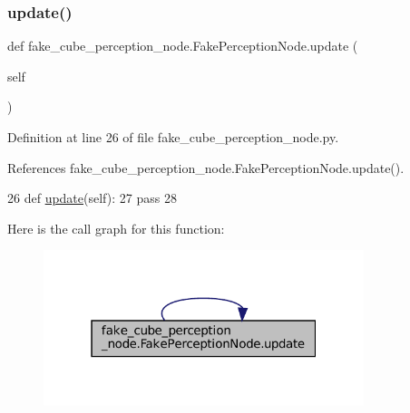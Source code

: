\subsubsection{\texorpdfstring{update()}{update()}\hspace{0.1cm}{\footnotesize\ttfamily [1/3]}}
{\footnotesize\ttfamily def fake\+\_\+cube\+\_\+perception\+\_\+node.\+Fake\+Perception\+Node.\+update (\begin{DoxyParamCaption}\item[{}]{self }\end{DoxyParamCaption})}



Definition at line 26 of file fake\+\_\+cube\+\_\+perception\+\_\+node.\+py.



References fake\+\_\+cube\+\_\+perception\+\_\+node.\+Fake\+Perception\+Node.\+update().


\begin{DoxyCode}
26     \textcolor{keyword}{def }\hyperlink{classfake__cube__perception__node_1_1FakePerceptionNode_ae73741e7f84f057cbf109698e70a2515}{update}(self):
27         \textcolor{keywordflow}{pass}
28 
\end{DoxyCode}
Here is the call graph for this function\+:
\nopagebreak
\begin{figure}[H]
\begin{center}
\leavevmode
\includegraphics[width=265pt]{classfake__cube__perception__node_1_1FakePerceptionNode_ae73741e7f84f057cbf109698e70a2515_cgraph}
\end{center}
\end{figure}
\mbox{\label{classfake__cube__perception__node_1_1FakePerceptionNode_ae73741e7f84f057cbf109698e70a2515}} 
